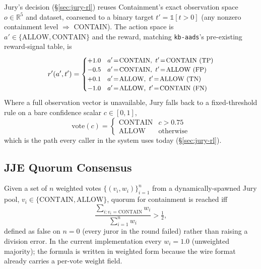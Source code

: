 \documentclass{article}
\begin{document}
Jury's decision (\S\ref{sec:jury-rl}) reuses Containment's exact
observation space $o \in \mathbb{R}^5$ and dataset, coarsened to a
binary target
$t' = \mathbb{1}[t > 0]$ (any nonzero containment level $\Rightarrow$
CONTAIN). The action space is $a' \in \{\text{ALLOW}, \text{CONTAIN}\}$
and the reward, matching \texttt{kb-aads}'s pre-existing reward-signal
table, is
\begin{equation}
  \small
  r'(a', t') =
  \begin{cases}
    +1.0 & a'\!=\!\text{CONTAIN},\ t'\!=\!\text{CONTAIN}\ \text{(TP)}\\
    -0.5 & a'\!=\!\text{CONTAIN},\ t'\!=\!\text{ALLOW}\ \text{(FP)}\\
    +0.1 & a'\!=\!\text{ALLOW},\ t'\!=\!\text{ALLOW}\ \text{(TN)}\\
    -1.0 & a'\!=\!\text{ALLOW},\ t'\!=\!\text{CONTAIN}\ \text{(FN)}
  \end{cases}
  \normalsize
  \label{eq:jury-reward}
\end{equation}
Where a full observation vector is unavailable, Jury falls back to a
fixed-threshold rule on a bare confidence scalar $c \in [0,1]$,
\begin{equation}
  \mathrm{vote}(c) = \begin{cases}\text{CONTAIN} & c > 0.75\\ \text{ALLOW} & \text{otherwise}\end{cases}
  \label{eq:jury-fallback}
\end{equation}
which is the path every caller in the system uses today (\S\ref{sec:jury-rl}).

\subsection{JJE Quorum Consensus}
\label{sec:math-quorum}

Given a set of $n$ weighted votes $\{(v_i, w_i)\}_{i=1}^n$ from a
dynamically-spawned Jury pool, $v_i \in \{\text{CONTAIN}, \text{ALLOW}\}$,
quorum for containment is reached iff
\begin{equation}
  \frac{\sum_{i: v_i = \text{CONTAIN}} w_i}{\sum_{i=1}^n w_i} > \tfrac12,
  \label{eq:quorum}
\end{equation}
defined as false on $n=0$ (every juror in the round failed) rather
than raising a division error. In the current implementation every
$w_i = 1.0$ (unweighted majority); the formula is written in weighted
form because the wire format already carries a per-vote weight field.
\end{document}

